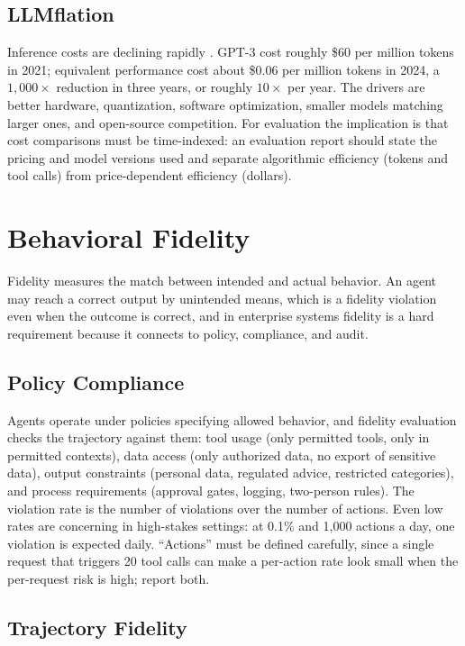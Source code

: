 \documentclass[11pt]{book}
\begin{document}
\subsection{LLMflation}

Inference costs are declining rapidly \cite{llmflation2024}. GPT-3 cost roughly \$60 per million tokens in 2021; equivalent performance cost about \$0.06 per million tokens in 2024, a $1{,}000\times$ reduction in three years, or roughly $10\times$ per year. The drivers are better hardware, quantization, software optimization, smaller models matching larger ones, and open-source competition. For evaluation the implication is that cost comparisons must be time-indexed: an evaluation report should state the pricing and model versions used and separate algorithmic efficiency (tokens and tool calls) from price-dependent efficiency (dollars).

\section{Behavioral Fidelity}

Fidelity measures the match between intended and actual behavior. An agent may reach a correct output by unintended means, which is a fidelity violation even when the outcome is correct, and in enterprise systems fidelity is a hard requirement because it connects to policy, compliance, and audit.

\subsection{Policy Compliance}

Agents operate under policies specifying allowed behavior, and fidelity evaluation checks the trajectory against them: tool usage (only permitted tools, only in permitted contexts), data access (only authorized data, no export of sensitive data), output constraints (personal data, regulated advice, restricted categories), and process requirements (approval gates, logging, two-person rules). The violation rate is the number of violations over the number of actions. Even low rates are concerning in high-stakes settings: at 0.1\% and 1{,}000 actions a day, one violation is expected daily. ``Actions'' must be defined carefully, since a single request that triggers 20 tool calls can make a per-action rate look small when the per-request risk is high; report both.

\subsection{Trajectory Fidelity}
\end{document}
